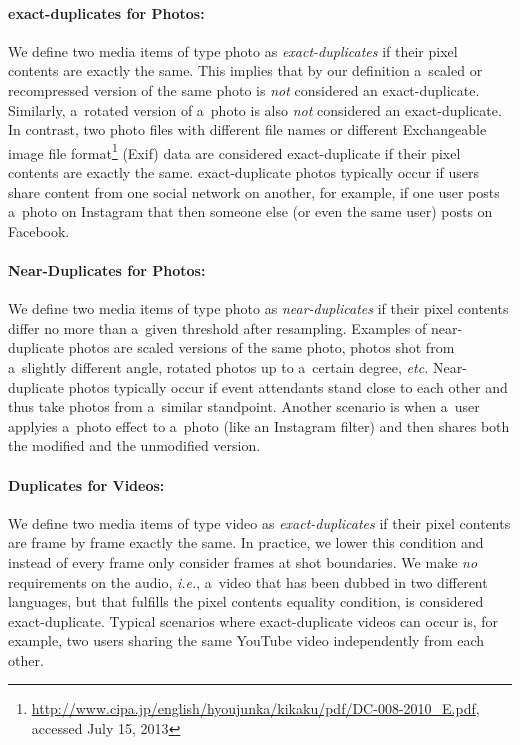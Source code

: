 \paragraph{exact-duplicates for Photos:}

We define two media items of type photo as \emph{exact-duplicates}
if their pixel contents are exactly the same.
This implies that by our definition a~scaled or recompressed version
of the same photo is \emph{not} considered an exact-duplicate.
Similarly, a~rotated version of a~photo is also \emph{not}
considered an exact-duplicate.
In contrast, two photo files with different file names
or different Exchangeable image file
format\footnote{\url{http://www.cipa.jp/english/hyoujunka/kikaku/pdf/DC-008-2010_E.pdf},
accessed July 15, 2013}
(Exif) data are considered exact-duplicate
if their pixel contents are exactly the same.
exact-duplicate photos typically occur if users share content
from one social network on another, for example,
if one user posts a~photo on Instagram that then someone else
(or even the same user) posts on Facebook.

\paragraph{Near-Duplicates for Photos:}

We define two media items of type photo as \emph{near-duplicates}
if their pixel contents differ no more than a~given threshold after resampling.
Examples of near-duplicate photos are scaled versions
of the same photo, photos shot from a~slightly different angle,
rotated photos up to a~certain degree, \emph{etc.}
Near-duplicate photos typically occur if event attendants
stand close to each other and thus take photos
from a~similar standpoint.
Another scenario is when a~user applyies a~photo effect to a~photo
(like an Instagram filter) and then shares both the modified
and the unmodified version.

\paragraph{Duplicates for Videos:}

We define two media items of type video as \emph{exact-duplicates}
if their pixel contents are frame by frame exactly the same.
In practice, we lower this condition and instead of every frame
only consider frames at shot boundaries.
We make \emph{no} requirements on the audio, \emph{i.e.},
a~video that has been dubbed in two different languages,
but that fulfills the pixel contents equality condition,
is considered exact-duplicate.
Typical scenarios where exact-duplicate videos can occur is,
for example, two users sharing the same YouTube video
independently from each other.

